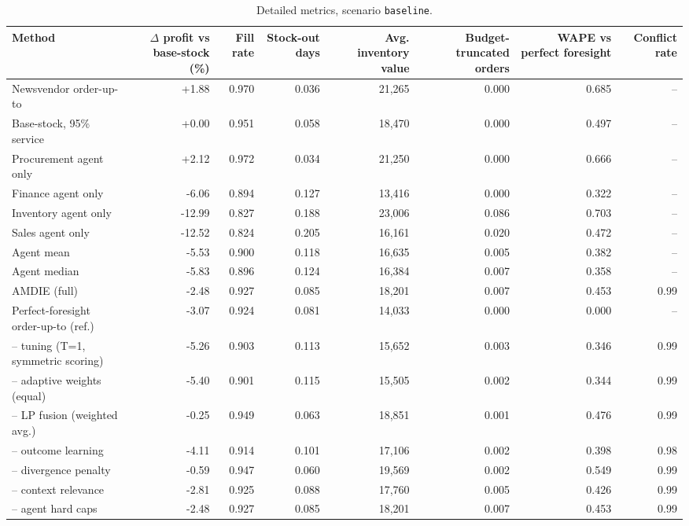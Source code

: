 \begin{table}[t]
\centering\small
\caption{Detailed metrics, scenario \texttt{baseline}.}\label{tab:detail-baseline}
\begin{tabular}{lrrrrrrr}
\toprule
Method & $\Delta$ profit vs base-stock (\%) & Fill rate & Stock-out days & Avg. inventory value & Budget-truncated orders & WAPE vs perfect foresight & Conflict rate \\
\midrule
Newsvendor order-up-to & +1.88 & 0.970 & 0.036 & 21,265 & 0.000 & 0.685 & -- \\
Base-stock, 95\% service & +0.00 & 0.951 & 0.058 & 18,470 & 0.000 & 0.497 & -- \\
Procurement agent only & +2.12 & 0.972 & 0.034 & 21,250 & 0.000 & 0.666 & -- \\
Finance agent only & -6.06 & 0.894 & 0.127 & 13,416 & 0.000 & 0.322 & -- \\
Inventory agent only & -12.99 & 0.827 & 0.188 & 23,006 & 0.086 & 0.703 & -- \\
Sales agent only & -12.52 & 0.824 & 0.205 & 16,161 & 0.020 & 0.472 & -- \\
Agent mean & -5.53 & 0.900 & 0.118 & 16,635 & 0.005 & 0.382 & -- \\
Agent median & -5.83 & 0.896 & 0.124 & 16,384 & 0.007 & 0.358 & -- \\
AMDIE (full) & -2.48 & 0.927 & 0.085 & 18,201 & 0.007 & 0.453 & 0.99 \\
Perfect-foresight order-up-to (ref.) & -3.07 & 0.924 & 0.081 & 14,033 & 0.000 & 0.000 & -- \\
-- tuning (T=1, symmetric scoring) & -5.26 & 0.903 & 0.113 & 15,652 & 0.003 & 0.346 & 0.99 \\
-- adaptive weights (equal) & -5.40 & 0.901 & 0.115 & 15,505 & 0.002 & 0.344 & 0.99 \\
-- LP fusion (weighted avg.) & -0.25 & 0.949 & 0.063 & 18,851 & 0.001 & 0.476 & 0.99 \\
-- outcome learning & -4.11 & 0.914 & 0.101 & 17,106 & 0.002 & 0.398 & 0.98 \\
-- divergence penalty & -0.59 & 0.947 & 0.060 & 19,569 & 0.002 & 0.549 & 0.99 \\
-- context relevance & -2.81 & 0.925 & 0.088 & 17,760 & 0.005 & 0.426 & 0.99 \\
-- agent hard caps & -2.48 & 0.927 & 0.085 & 18,201 & 0.007 & 0.453 & 0.99 \\
\bottomrule
\end{tabular}
\end{table}

